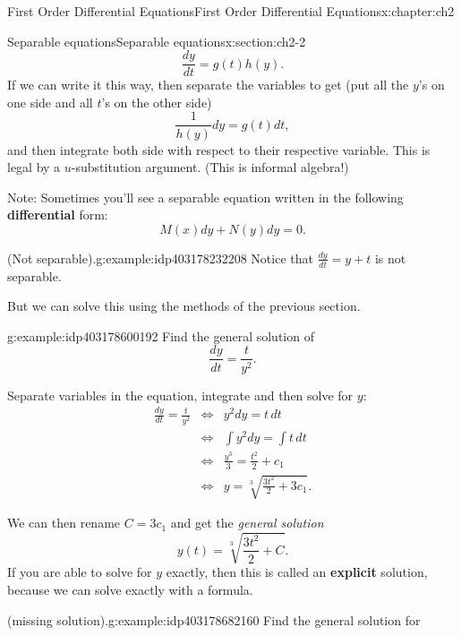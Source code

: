 \documentclass[oneside,10pt,]{book}
\newcommand{\terminology}[1]{\textbf{#1}}
\numberwithin{equation}{section}
\numberwithin{equation}{section}
\newcommand{\amp}{&}
\begin{document}
\begin{chapterptx}{First Order Differential Equations}{}{First Order Differential Equations}{}{}{x:chapter:ch2}
\begin{sectionptx}{Separable equations}{}{Separable equations}{}{}{x:section:ch2-2}
\begin{equation}
\frac{dy}{dt}=g(t)h(y).\label{x:men:sepeqn}
\end{equation}
If we can write it this way, then separate the variables to get (put all the \(y\)'s on one side and all \(t\)'s on the other side)%
\begin{equation*}
\frac{1}{h(y)}dy=g(t)dt,
\end{equation*}
and then integrate both side with respect to their respective variable. This is legal by a \(u\)-substitution argument. (This is informal algebra!)%
\par
Note: Sometimes you'll see a separable equation written in the following \terminology{differential} form:%
\begin{equation*}
M(x)dy+N(y)dy=0.
\end{equation*}
%
\begin{example}{(Not separable).}{g:example:idp403178232208}%
Notice that \(\frac{dy}{dt}=y+t\) is not separable.%
\par
But we can solve this using the methods of the previous section.%
\end{example}
\begin{example}{}{g:example:idp403178600192}%
Find the general solution of%
\begin{equation*}
\frac{dy}{dt}=\frac{t}{y^{2}}.
\end{equation*}
%
\par
Separate variables in the equation, integrate and then solve for \(y\):%
\begin{align*}
\frac{dy}{dt}=\frac{t}{y^{2}} \amp \iff \amp y^{2}dy=t\,dt\\
\amp \iff \amp \int y^{2}dy=\int t\,dt\\
\amp \iff \amp \frac{y^{3}}{3}=\frac{t^{2}}{2}+c_{1}\\
\amp \iff \amp y=\sqrt[3]{\frac{3t^{2}}{2}+3c_{1}}.
\end{align*}
%
\par
We can then rename \(C=3c_{1}\) and get the \emph{general solution}%
\begin{equation*}
y(t)=\sqrt[3]{\frac{3t^{2}}{2}+C}.
\end{equation*}
If you are able to solve for \(y\) exactly, then this is called an \terminology{explicit} solution, because we can solve exactly with a formula.%
\end{example}
\begin{example}{(missing solution).}{g:example:idp403178682160}%
Find the general solution for%

\end{example}
\end{sectionptx}
\end{chapterptx}
\end{document}
